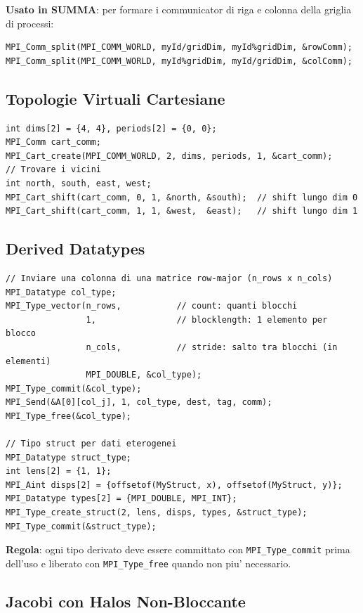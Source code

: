 \documentclass[11pt,a4paper]{article}
\theoremstyle{remark}
\begin{document}
\textbf{Usato in SUMMA}: per formare i communicator di riga e colonna della griglia di processi:
\begin{lstlisting}[style=cpp]
MPI_Comm_split(MPI_COMM_WORLD, myId/gridDim, myId%gridDim, &rowComm);
MPI_Comm_split(MPI_COMM_WORLD, myId%gridDim, myId/gridDim, &colComm);
\end{lstlisting}

\subsection{Topologie Virtuali Cartesiane}

\begin{lstlisting}[style=cpp]
int dims[2] = {4, 4}, periods[2] = {0, 0};
MPI_Comm cart_comm;
MPI_Cart_create(MPI_COMM_WORLD, 2, dims, periods, 1, &cart_comm);
// Trovare i vicini
int north, south, east, west;
MPI_Cart_shift(cart_comm, 0, 1, &north, &south);  // shift lungo dim 0
MPI_Cart_shift(cart_comm, 1, 1, &west,  &east);   // shift lungo dim 1
\end{lstlisting}

\subsection{Derived Datatypes}

\begin{lstlisting}[style=cpp]
// Inviare una colonna di una matrice row-major (n_rows x n_cols)
MPI_Datatype col_type;
MPI_Type_vector(n_rows,           // count: quanti blocchi
                1,                // blocklength: 1 elemento per blocco
                n_cols,           // stride: salto tra blocchi (in elementi)
                MPI_DOUBLE, &col_type);
MPI_Type_commit(&col_type);
MPI_Send(&A[0][col_j], 1, col_type, dest, tag, comm);
MPI_Type_free(&col_type);

// Tipo struct per dati eterogenei
MPI_Datatype struct_type;
int lens[2] = {1, 1};
MPI_Aint disps[2] = {offsetof(MyStruct, x), offsetof(MyStruct, y)};
MPI_Datatype types[2] = {MPI_DOUBLE, MPI_INT};
MPI_Type_create_struct(2, lens, disps, types, &struct_type);
MPI_Type_commit(&struct_type);
\end{lstlisting}

\textbf{Regola}: ogni tipo derivato deve essere committato con \lstinline|MPI_Type_commit| prima dell'uso e liberato con \lstinline|MPI_Type_free| quando non piu' necessario.

\subsection{Jacobi con Halos Non-Bloccante}
\end{document}
